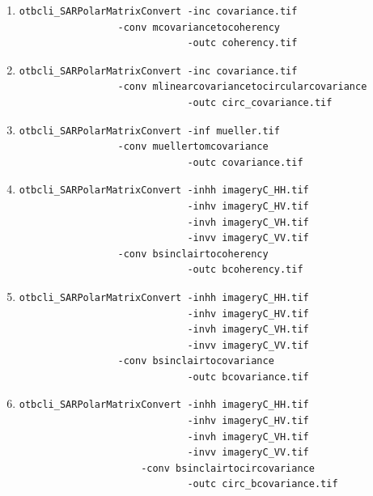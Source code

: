 \begin{enumerate}
\item 
\begin{verbatim} 
otbcli_SARPolarMatrixConvert -inc covariance.tif 
			     -conv mcovariancetocoherency
                             -outc coherency.tif 
\end{verbatim}
									  
\item 
\begin{verbatim} 
otbcli_SARPolarMatrixConvert -inc covariance.tif 
			     -conv mlinearcovariancetocircularcovariance
                             -outc circ_covariance.tif 
\end{verbatim}	
									  			
\item 
\begin{verbatim} 
otbcli_SARPolarMatrixConvert -inf mueller.tif 
			     -conv muellertomcovariance
                             -outc covariance.tif 
\end{verbatim}	
									  								  
\item 
\begin{verbatim} 
otbcli_SARPolarMatrixConvert -inhh imageryC_HH.tif 
                             -inhv imageryC_HV.tif 
                             -invh imageryC_VH.tif 
                             -invv imageryC_VV.tif
			     -conv bsinclairtocoherency
                             -outc bcoherency.tif 
\end{verbatim}
									  
\item 
\begin{verbatim} 
otbcli_SARPolarMatrixConvert -inhh imageryC_HH.tif 
                             -inhv imageryC_HV.tif 
                             -invh imageryC_VH.tif 
                             -invv imageryC_VV.tif 
			     -conv bsinclairtocovariance
                             -outc bcovariance.tif 
\end{verbatim}
									  
\item 
\begin{verbatim} 
otbcli_SARPolarMatrixConvert -inhh imageryC_HH.tif 
                             -inhv imageryC_HV.tif 
                             -invh imageryC_VH.tif 
                             -invv imageryC_VV.tif
		             -conv bsinclairtocircovariance
                             -outc circ_bcovariance.tif 
\end{verbatim}
									  

\end{enumerate}
